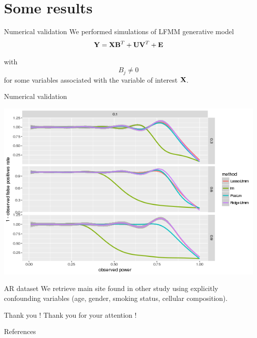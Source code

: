 \documentclass[presentation]{beamer}
\begin{document}
\section{Some results}
\label{sec:org64f75ee}
\begin{frame}[label={sec:org9b5e6d5}]{Numerical validation}
We performed simulations of LFMM generative model $$\mathbf{Y} = \mathbf{X} \mathbf{B}^T + \mathbf{U} \mathbf{V}^T + \mathbf{E}$$ 

with $$ B_{j} \neq 0$$ for some variables associated with the variable of
interest \(\mathbf{X}\).
\end{frame}
\begin{frame}[label={sec:org76bf15a}]{Numerical validation}
\begin{center}
\includegraphics[width=.9\linewidth]{./Rplots/method_comp.png}
\end{center}
\end{frame}

\begin{frame}[label={sec:org705f355}]{AR dataset}
We retrieve main site found in other study using explicitly confounding
variables (age, gender, smoking status, cellular composition).
\end{frame}

\begin{frame}[label={sec:org7ec42ef}]{Thank you !}
Thank you for your attention ! 
\end{frame}

\begin{frame}[label={sec:orgdc978db}]{References}


\end{frame}
\end{document}
